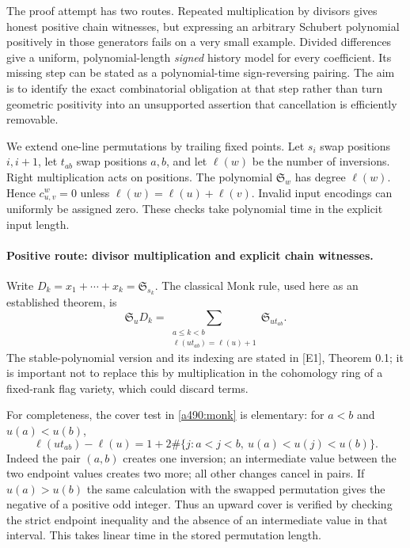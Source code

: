 \documentclass[11pt]{article}
\begin{document}
The proof attempt has two routes. Repeated multiplication by divisors gives
honest positive chain witnesses, but expressing an arbitrary Schubert
polynomial positively in those generators fails on a very small example.
Divided differences give a uniform, polynomial-length \emph{signed}
history model for every coefficient. Its missing step can be stated as a
polynomial-time sign-reversing pairing. The aim is to identify the exact
combinatorial obligation at that step rather than turn geometric positivity
into an unsupported assertion that cancellation is efficiently removable.

We extend one-line permutations by trailing fixed points. Let $s_i$ swap
positions $i,i+1$, let $t_{ab}$ swap positions $a,b$, and let
$\ell(w)$ be the number of inversions. Right multiplication acts on
positions. The polynomial $\mathfrak S_w$ has degree $\ell(w)$.
Hence $c_{u,v}^w=0$ unless $\ell(w)=\ell(u)+\ell(v)$. Invalid input
encodings can uniformly be assigned zero. These checks take polynomial
time in the explicit input length.

\paragraph{Positive route: divisor multiplication and explicit chain witnesses.}
Write $D_k=x_1+\cdots+x_k=\mathfrak S_{s_k}$. The classical Monk rule,
used here as an established theorem, is
\begin{equation}\label{a490:monk}
 \mathfrak S_uD_k=
 \sum_{\substack{a\leq k<b\\\ell(ut_{ab})=\ell(u)+1}}
                      \mathfrak S_{ut_{ab}}.
\end{equation}
The stable-polynomial version and its indexing are stated in [E1],
Theorem 0.1; it is important not to replace this by multiplication in the
cohomology ring of a fixed-rank flag variety, which could discard terms.

For completeness, the cover test in \eqref{a490:monk} is elementary:
for $a<b$ and $u(a)<u(b)$,
\begin{equation}\label{a490:cover}
 \ell(ut_{ab})-\ell(u)
 =1+2\#\{j:a<j<b,\ u(a)<u(j)<u(b)\}.
\end{equation}
Indeed the pair $(a,b)$ creates one inversion; an intermediate value between
the two endpoint values creates two more; all other changes cancel in
pairs. If $u(a)>u(b)$ the same calculation with the swapped permutation
gives the negative of a positive odd integer. Thus an upward cover is
verified by checking the strict endpoint inequality and the absence of an
intermediate value in that interval. This takes linear time in the stored
permutation length.
\end{document}
